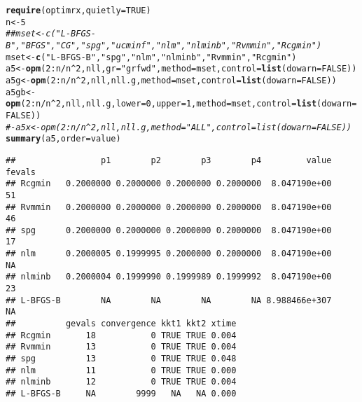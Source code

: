 \documentclass[11pt]{article}\usepackage[]{graphicx}\usepackage[]{color}
\makeatletter
\newcommand{\hlnum}[1]{\textcolor[rgb]{0.686,0.059,0.569}{#1}}%
\newcommand{\hlstr}[1]{\textcolor[rgb]{0.192,0.494,0.8}{#1}}%
\newcommand{\hlcom}[1]{\textcolor[rgb]{0.678,0.584,0.686}{\textit{#1}}}%
\newcommand{\hlopt}[1]{\textcolor[rgb]{0,0,0}{#1}}%
\newcommand{\hlstd}[1]{\textcolor[rgb]{0.345,0.345,0.345}{#1}}%
\newcommand{\hlkwb}[1]{\textcolor[rgb]{0.69,0.353,0.396}{#1}}%
\newcommand{\hlkwc}[1]{\textcolor[rgb]{0.333,0.667,0.333}{#1}}%
\newcommand{\hlkwd}[1]{\textcolor[rgb]{0.737,0.353,0.396}{\textbf{#1}}}%
\newenvironment{kframe}{%
 \def\at@end@of@kframe{}%
 \ifinner\ifhmode%
  \def\at@end@of@kframe{\end{minipage}}%
  \begin{minipage}{\columnwidth}%
 \fi\fi%
 \def\FrameCommand##1{\hskip\@totalleftmargin \hskip-\fboxsep
 \colorbox{shadecolor}{##1}\hskip-\fboxsep
     \hskip-\linewidth \hskip-\@totalleftmargin \hskip\columnwidth}%
 \MakeFramed {\advance\hsize-\width
   \@totalleftmargin\z@ \linewidth\hsize
   \@setminipage}}%
 {\par\unskip\endMakeFramed%
 \at@end@of@kframe}
\newenvironment{knitrout}{}{} %
\makeatother
\begin{document}
\begin{knitrout}\scriptsize
{}\color{fgcolor}\begin{kframe}
\begin{alltt}
\hlkwd{require}\hlstd{(optimrx,} \hlkwc{quietly}\hlstd{=}\hlnum{TRUE}\hlstd{)}
\hlstd{n}\hlkwb{<-}\hlnum{5}
\hlcom{## mset<-c("L-BFGS-B", "BFGS", "CG", "spg", "ucminf", "nlm", "nlminb", "Rvmmin", "Rcgmin")}
\hlstd{mset}\hlkwb{<-}\hlkwd{c}\hlstd{(}\hlstr{"L-BFGS-B"}\hlstd{,} \hlstr{"spg"}\hlstd{,} \hlstr{"nlm"}\hlstd{,} \hlstr{"nlminb"}\hlstd{,} \hlstr{"Rvmmin"}\hlstd{,} \hlstr{"Rcgmin"}\hlstd{)}
\hlstd{a5}\hlkwb{<-}\hlkwd{opm}\hlstd{(}\hlnum{2}\hlopt{:}\hlstd{n}\hlopt{/}\hlstd{n}\hlopt{^}\hlnum{2}\hlstd{, nll,} \hlkwc{gr}\hlstd{=}\hlstr{"grfwd"}\hlstd{,} \hlkwc{method}\hlstd{=mset,} \hlkwc{control}\hlstd{=}\hlkwd{list}\hlstd{(}\hlkwc{dowarn}\hlstd{=}\hlnum{FALSE}\hlstd{))}
\hlstd{a5g}\hlkwb{<-}\hlkwd{opm}\hlstd{(}\hlnum{2}\hlopt{:}\hlstd{n}\hlopt{/}\hlstd{n}\hlopt{^}\hlnum{2}\hlstd{, nll, nll.g,} \hlkwc{method}\hlstd{=mset,} \hlkwc{control}\hlstd{=}\hlkwd{list}\hlstd{(}\hlkwc{dowarn}\hlstd{=}\hlnum{FALSE}\hlstd{))}
\hlstd{a5gb}\hlkwb{<-}\hlkwd{opm}\hlstd{(}\hlnum{2}\hlopt{:}\hlstd{n}\hlopt{/}\hlstd{n}\hlopt{^}\hlnum{2}\hlstd{, nll, nll.g,} \hlkwc{lower}\hlstd{=}\hlnum{0}\hlstd{,} \hlkwc{upper}\hlstd{=}\hlnum{1}\hlstd{,} \hlkwc{method}\hlstd{=mset,} \hlkwc{control}\hlstd{=}\hlkwd{list}\hlstd{(}\hlkwc{dowarn}\hlstd{=}\hlnum{FALSE}\hlstd{))}
\hlcom{#- a5x <- opm(2:n/n^2, nll, nll.g, method="ALL", control=list(dowarn=FALSE))}
\hlkwd{summary}\hlstd{(a5,}\hlkwc{order}\hlstd{=value)}
\end{alltt}
\begin{verbatim}
##                 p1        p2        p3        p4         value fevals
## Rcgmin   0.2000000 0.2000000 0.2000000 0.2000000  8.047190e+00     51
## Rvmmin   0.2000000 0.2000000 0.2000000 0.2000000  8.047190e+00     46
## spg      0.2000000 0.2000000 0.2000000 0.2000000  8.047190e+00     17
## nlm      0.2000005 0.1999995 0.2000000 0.2000000  8.047190e+00     NA
## nlminb   0.2000004 0.1999990 0.1999989 0.1999992  8.047190e+00     23
## L-BFGS-B        NA        NA        NA        NA 8.988466e+307     NA
##          gevals convergence kkt1 kkt2 xtime
## Rcgmin       18           0 TRUE TRUE 0.004
## Rvmmin       13           0 TRUE TRUE 0.004
## spg          13           0 TRUE TRUE 0.048
## nlm          11           0 TRUE TRUE 0.000
## nlminb       12           0 TRUE TRUE 0.004
## L-BFGS-B     NA        9999   NA   NA 0.000
\end{verbatim}

\end{kframe}
\end{knitrout}
\end{document}
